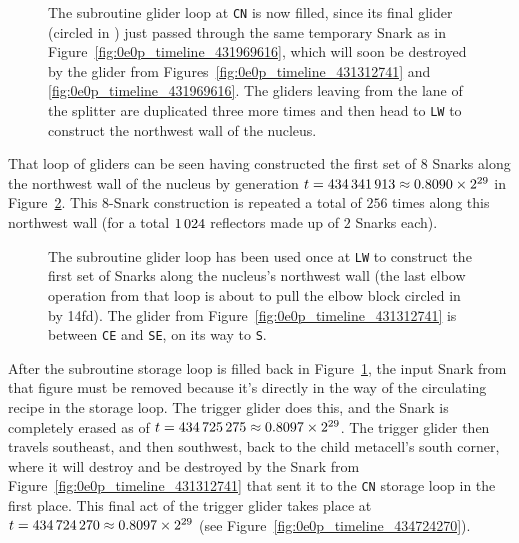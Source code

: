\begin{figure}[!htb]
	\centering
	\caption{The subroutine glider loop at \texttt{CN} is now filled, since its final glider (circled in ) just passed through the same temporary Snark as in Figure~\ref{fig:0e0p_timeline_431969616}, which will soon be destroyed by the glider from Figures~\ref{fig:0e0p_timeline_431312741} and \ref{fig:0e0p_timeline_431969616}. The gliders leaving from the  lane of the splitter are duplicated three more times and then head to \texttt{LW} to construct the northwest wall of the nucleus.}
	\label{fig:0e0p_timeline_433582348}
\end{figure}

That loop of gliders can be seen having constructed the first set of $8$ Snarks along the northwest wall of the nucleus by generation $t = 434{\,}341{\,}913 \approx 0.8090 \times 2^{29}$ in Figure~\ref{fig:0e0p_timeline_434341913}. This $8$-Snark construction is repeated a total of $256$ times along this northwest wall (for a total $1{\,}024$ reflectors made up of $2$ Snarks each).

\begin{figure}[!htb]
	\centering
	\caption{The subroutine glider loop has been used once at \texttt{LW} to construct the first set of Snarks along the nucleus's northwest wall (the last elbow operation from that loop is about to pull the elbow block circled in  by 14fd). The glider from Figure~\ref{fig:0e0p_timeline_431312741} is between \texttt{CE} and \texttt{SE}, on its way to \texttt{S}.}
	\label{fig:0e0p_timeline_434341913}
\end{figure}

After the subroutine storage loop is filled back in Figure~\ref{fig:0e0p_timeline_433582348}, the input Snark from that figure must be removed because it's directly in the way of the circulating recipe in the storage loop. The trigger glider does this, and the Snark is completely erased as of $t = 434{\,}725{\,}275 \approx 0.8097 \times 2^{29}$. The trigger glider then travels southeast, and then southwest, back to the child metacell's south corner, where it will destroy and be destroyed by the Snark from Figure~\ref{fig:0e0p_timeline_431312741} that sent it to the \texttt{CN} storage loop in the first place. This final act of the trigger glider takes place at $t = 434{\,}724{\,}270 \approx 0.8097 \times 2^{29}$ (see Figure~\ref{fig:0e0p_timeline_434724270}).

